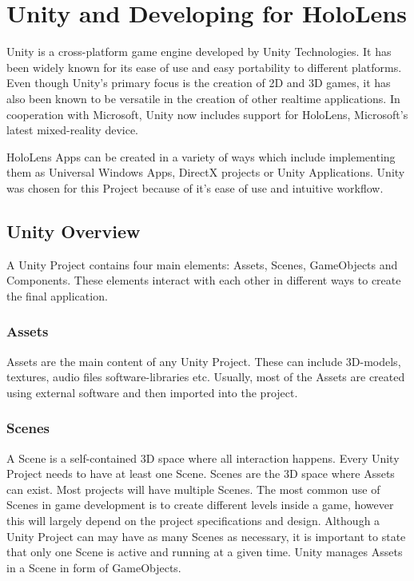 \chapter{Unity and Developing for HoloLens}\label{sec:unity}
Unity is a cross-platform game engine developed by Unity Technologies. It has been widely known for its ease of use and easy portability to different platforms. Even though Unity's primary focus is the creation of 2D and 3D games, it has also been known to be versatile in the creation of other realtime applications. In cooperation with Microsoft, Unity now includes support for HoloLens, Microsoft's latest mixed-reality device.\par

HoloLens Apps can be created in a variety of ways which include implementing them as Universal Windows Apps, DirectX projects or Unity Applications. Unity was chosen for this Project because of it's ease of use and intuitive workflow.

\section{Unity Overview}
A Unity Project contains four main elements: Assets, Scenes, GameObjects and Components. These elements interact with each other in different ways to create the final application.

\subsection{Assets}
Assets are the main content of any Unity Project. These can include 3D-models, textures, audio files software-libraries etc. Usually, most of the Assets are created using external software and then imported into the project.

\subsection{Scenes}
A Scene is a self-contained 3D space where all interaction happens. Every Unity Project needs to have at least one Scene. Scenes are the 3D space where Assets can exist. Most projects will have multiple Scenes. The most common use of Scenes in game development is to create different levels inside a game, however this will largely depend on the project specifications and design. Although a Unity Project can may have as many Scenes as necessary, it is important to state that only one Scene is active and running at a given time. Unity manages Assets in a Scene in form of GameObjects.

